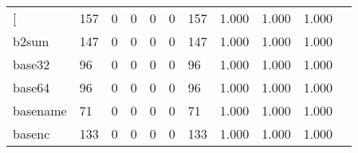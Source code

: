 \begin{longtable}{lp{1.2cm}p{1.2cm}p{1.2cm}p{1.2cm}p{1.2cm}p{1.2cm}p{1.2cm}p{1.2cm}p{1.2cm}p{1.2cm}}
\bottomrule
\endlastfoot
{[}         &                                   157 &                                                  0 &                                                  0 &                                                  0 &                                                  0 &                                                157 &                                         1.000 &                                              1.000 &                                              1.000 \\
b2sum     &                                   147 &                                                  0 &                                                  0 &                                                  0 &                                                  0 &                                                147 &                                         1.000 &                                              1.000 &                                              1.000 \\
base32    &                                    96 &                                                  0 &                                                  0 &                                                  0 &                                                  0 &                                                 96 &                                         1.000 &                                              1.000 &                                              1.000 \\
base64    &                                    96 &                                                  0 &                                                  0 &                                                  0 &                                                  0 &                                                 96 &                                         1.000 &                                              1.000 &                                              1.000 \\
basename  &                                    71 &                                                  0 &                                                  0 &                                                  0 &                                                  0 &                                                 71 &                                         1.000 &                                              1.000 &                                              1.000 \\
basenc    &                                   133 &                                                  0 &                                                  0 &                                                  0 &                                                  0 &                                                133 &                                         1.000 &                                              1.000 &                                              1.000 \\

\end{longtable}
